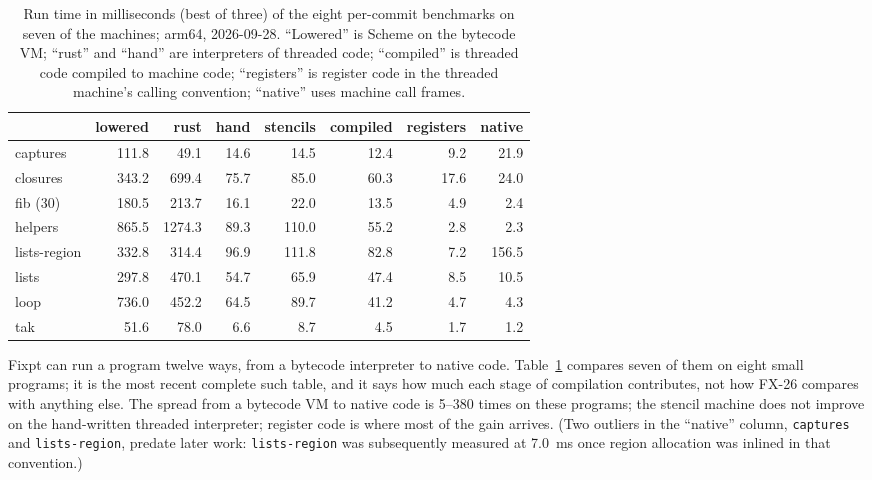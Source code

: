 \documentclass[acmsmall,screen,review]{acmart}
\newcommand{\cd}[1]{\texttt{#1}}
\newcommand{\fx}{FX-26}
\begin{document}
\begin{table}[t]
\caption{Run time in milliseconds (best of three) of the eight
per-commit benchmarks on seven of the machines; arm64, 2026-09-28.
``Lowered'' is Scheme on the bytecode VM; ``rust'' and ``hand'' are
interpreters of threaded code; ``compiled'' is threaded code compiled
to machine code; ``registers'' is register code in the threaded machine's calling convention; ``native'' uses machine call frames.}
\label{tab:machines}
\small
\begin{tabular}{@{}lrrrrrrr@{}}
\toprule
 & lowered & rust & hand & stencils & compiled & registers & native\\
\midrule
captures & 111.8 & 49.1 & 14.6 & 14.5 & 12.4 & 9.2 & 21.9\\
closures & 343.2 & 699.4 & 75.7 & 85.0 & 60.3 & 17.6 & 24.0\\
fib (30) & 180.5 & 213.7 & 16.1 & 22.0 & 13.5 & 4.9 & 2.4\\
helpers & 865.5 & 1274.3 & 89.3 & 110.0 & 55.2 & 2.8 & 2.3\\
lists-region & 332.8 & 314.4 & 96.9 & 111.8 & 82.8 & 7.2 & 156.5\\
lists & 297.8 & 470.1 & 54.7 & 65.9 & 47.4 & 8.5 & 10.5\\
loop & 736.0 & 452.2 & 64.5 & 89.7 & 41.2 & 4.7 & 4.3\\
tak & 51.6 & 78.0 & 6.6 & 8.7 & 4.5 & 1.7 & 1.2\\
\bottomrule
\end{tabular}
\end{table}

Fixpt can run a program twelve ways, from a bytecode interpreter to
native code. Table~\ref{tab:machines} compares seven of them on eight
small programs; it is the most recent complete such table, and it says
how much each stage of compilation contributes, not how \fx{} compares
with anything else. The spread from a bytecode VM to native code is 5--380
times on these programs; the stencil machine does not improve on the
hand-written threaded interpreter; register code is where most of the
gain arrives. (Two outliers in the ``native'' column, \cd{captures}
and \cd{lists-region}, predate later work: \cd{lists-region} was
subsequently measured at 7.0~ms once region allocation was inlined in
that convention.)
\end{document}
